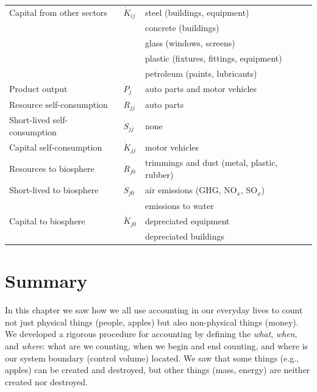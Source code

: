 \begin{table}
\begin{center}
\begin{tabular}{p{4cm}p{1cm}p{5.2cm}}
Capital from other sectors		& $\dot{K}_{ij}$		&	 steel (buildings, equipment)					\\
												&								&	 concrete (buildings)								\\
												&								&	 	glass (windows, screens)						\\
												&								&	 plastic (fixtures, fittings, equipment)		\\
												&								&	 	petroleum (paints, lubricants)				\\
\midrule
Product output							&	$\dot{P}_{j}$		&	auto parts and motor vehicles					\\[0.15cm]
\midrule
Resource self-consumption		&	$\dot{R}_{jj}$		&	auto parts												\\[0.15cm]
Short-lived self-consumption   &	$\dot{S}_{jj}$		&	none 														\\[0.15cm]
Capital self-consumption			&	$\dot{K}_{jj}$		&	motor vehicles											\\[0.15cm]
\midrule
Resources to biosphere			& $\dot{R}_{j0}$		&	trimmings and dust (metal, plastic, rubber)	\\[0.15cm]
Short-lived to biosphere			& $\dot{S}_{j0}$		&	air emissions (GHG, NO$_x$, SO$_x$)		\\
												&								& 	emissions to water									\\[0.15cm]
Capital to biosphere					& $\dot{K}_{j0}$	&	depreciated equipment								\\
												&								& 	depreciated buildings										\\
\bottomrule
\end{tabular}
\end{center}
\label{tab:materials_auto}
\end{table}


\section{Summary}
\label{sec:materials_summary}

In this chapter we saw how we all use accounting in our everyday lives
to count not just physical things (people, apples) but also non-physical things
(money). We developed a rigorous procedure for accounting by defining the 
\emph{what}, \emph{when}, and \emph{where}: what are we counting,
when we begin and end counting,
and where is our system boundary (control volume) located. 
We saw that some things (e.g., apples) can be
created and destroyed, but other things (mass, energy)
are neither created nor destroyed.

